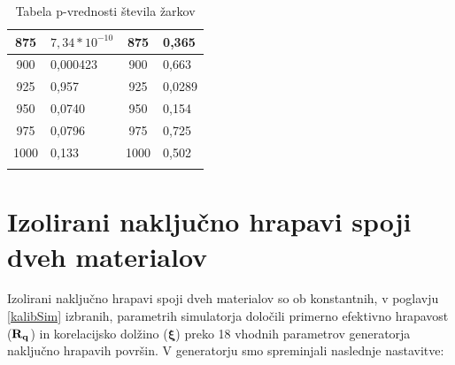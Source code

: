 \documentclass[a4paper,twoside,openright,12pt,slovene]{book}
\begin{document}
\begin{longtable}{| p{} | p{} | p{} | p{} |}
\multicolumn{1}{|c|}{875}                  & \color[HTML]{CE6301}$7,34*10^{-10}$                    & \multicolumn{1}{c|}{875}                  & \cellcolor{lime}0,365                            \\ \hline
\multicolumn{1}{|c|}{900}                  & \color[HTML]{CE6301}0,000423                         & \multicolumn{1}{c|}{900}                  & \cellcolor{lime}0,663                            \\ \hline
\multicolumn{1}{|c|}{925}                  & \cellcolor{lime}0,957                            & \multicolumn{1}{c|}{925}                  & \color[HTML]{FE0000}0,0289                           \\ \hline
\multicolumn{1}{|c|}{950}                  & \color[HTML]{FE0000}0,0740                           & \multicolumn{1}{c|}{950}                  & \cellcolor{lime}0,154                            \\ \hline
\multicolumn{1}{|c|}{975}                  & \color[HTML]{FE0000}0,0796                           & \multicolumn{1}{c|}{975}                  & \cellcolor{lime}0,725                            \\ \hline
\multicolumn{1}{|c|}{1000}                 & \cellcolor{lime}0,133                            & \multicolumn{1}{c|}{1000}                 & \cellcolor{lime}0,502                            \\ \hline

\caption{Tabela p-vrednosti števila žarkov}
\label{tab:pŽarek}
\end{longtable}

\clearpage


\section{Izolirani naključno hrapavi spoji dveh materialov}
\label{izolStiki}
Izolirani naključno hrapavi spoji dveh materialov so ob konstantnih, v poglavju \ref{kalibSim} izbranih, parametrih simulatorja določili primerno efektivno hrapavost ($\bf R_{q}$) in korelacijsko dolžino ($\boldsymbol \xi$) preko 18 vhodnih parametrov generatorja naključno hrapavih površin. V generatorju smo spreminjali naslednje nastavitve:
\end{document}
